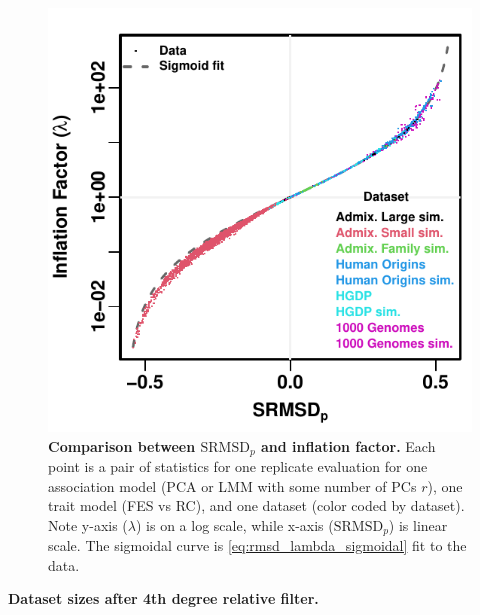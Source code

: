\documentclass[11pt]{article}
\newcommand{\rmsd}{\text{SRMSD}_p}
\begin{document}
\begin{figure}[bp!]
  \centering
  \includegraphics{sum-rmsd-vs-lambda.pdf}
  \caption{
    {\bf Comparison between $\rmsd$ and inflation factor.}
    Each point is a pair of statistics for one replicate evaluation for one association model (PCA or LMM with some number of PCs $r$), one trait model (FES vs RC), and one dataset (color coded by dataset).
    Note y-axis ($\lambda$) is on a log scale, while x-axis ($\rmsd$) is linear scale.
    The sigmoidal curve is \cref{eq:rmsd_lambda_sigmoidal} fit to the data.
  }
  \label{fig:rmsd_lambda}
\end{figure}

\begin{table}[hb!]
  \centering
  \footnotesize
  \caption{
    \textbf{Dataset sizes after 4th degree relative filter.}
  }
  \label{tab:king_cutoff}
\end{table}
\end{document}
